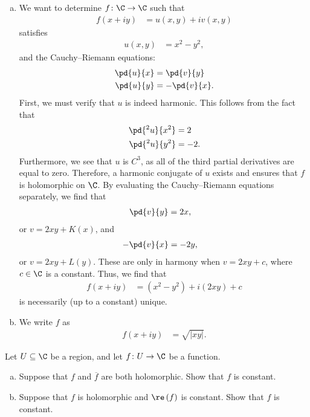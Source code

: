 \documentclass[10pt]{mypackage}
\begin{document}
\begin{solution}\hfill
  \begin{enumerate}[(a)]
    \item We want to determine $f\colon \C\rightarrow \C$ such that
      \begin{align*}
        f\left( x + iy \right) &= u\left( x,y \right) + iv\left( x,y \right)
      \end{align*}
      satisfies
      \begin{align*}
        u\left( x,y \right) &= x^2 - y^2,
      \end{align*}
      and the Cauchy--Riemann equations:
      \begin{align*}
        \pd{u}{x} &= \pd{v}{y}\\
        \pd{u}{y} &= -\pd{v}{x}.
      \end{align*}
      First, we must verify that $u$ is indeed harmonic. This follows from the fact that
      \begin{align*}
        \pd{^2u}{x^2} &= 2\\
        \pd{^2u}{y^2} &= -2.
      \end{align*}
      Furthermore, we see that $u$ is $C^{3}$, as all of the third partial derivatives are equal to zero. Therefore, a harmonic conjugate of $u$ exists and ensures that $f$ is holomorphic on $\C$. By evaluating the Cauchy--Riemann equations separately, we find that
      \begin{align*}
        \pd{v}{y} &= 2x,
      \end{align*}
      or $ v = 2xy + K(x)$, and
      \begin{align*}
        -\pd{v}{x} &= -2y,
      \end{align*}
      or $v = 2xy + L(y)$. These are only in harmony when $v = 2xy + c$, where $c\in \C$ is a constant. Thus, we find that
      \begin{align*}
        f\left( x + iy \right) &= \left( x^2 - y^2 \right) + i\left( 2xy \right) + c
      \end{align*}
      is necessarily (up to a constant) unique.
    \item We write $f$ as
      \begin{align*}
        f\left( x + iy \right) &= \sqrt{\left\vert xy \right\vert}.
      \end{align*}
  \end{enumerate}
\end{solution}
\begin{problem}[Problem 2]
  Let $U\subseteq \C$ be a region, and let $f\colon U\rightarrow \C$ be a function.
  \begin{enumerate}[(a)]
    \item Suppose that $f$ and $ \overline{f} $ are both holomorphic. Show that $f$ is constant.
    \item Suppose that $f$ is holomorphic and $\re\left( f \right)$ is constant. Show that $f$ is constant.
  \end{enumerate}
\end{problem}
\end{document}
